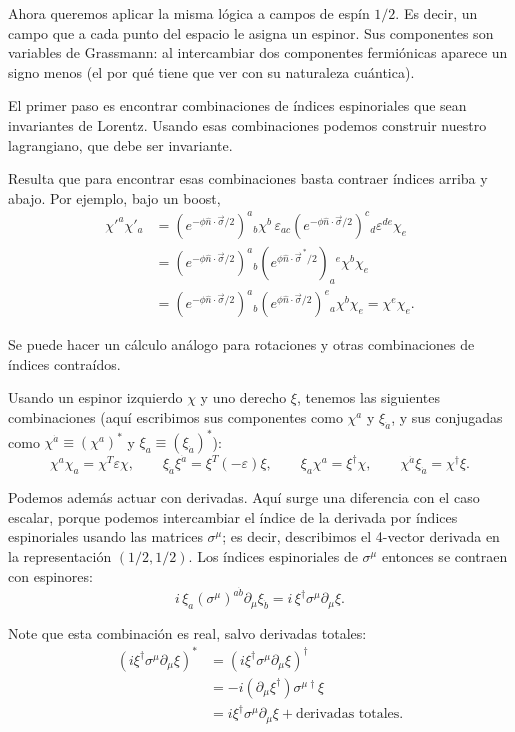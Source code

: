 \documentclass[11pt,a4paper]{article}
\begin{document}
Ahora queremos aplicar la misma lógica a campos de espín $1/2$. Es decir, un campo que a cada punto del espacio le asigna un espinor. Sus componentes son variables de Grassmann: al intercambiar dos componentes fermiónicas aparece un signo menos (el por qué tiene que ver con su naturaleza cuántica).

El primer paso es encontrar combinaciones de índices espinoriales que sean invariantes de Lorentz. Usando esas combinaciones podemos construir nuestro lagrangiano, que debe ser invariante.

Resulta que para encontrar esas combinaciones basta contraer índices arriba y abajo. Por ejemplo, bajo un boost,
\begin{align*}
  \chi'^a\chi'_a
  &=\left(e^{-\phi\hat n\cdot\vec\sigma/2}\right)^a{}_b
    \chi^b\,
    \varepsilon_{ac}
    \left(e^{-\phi\hat n\cdot\vec\sigma/2}\right)^c{}_d
    \varepsilon^{de}\chi_e \\
  &=\left(e^{-\phi\hat n\cdot\vec\sigma/2}\right)^a{}_b
    \left(e^{\phi\hat n\cdot\vec\sigma^{\,*}/2}\right)_a{}^e
    \chi^b\chi_e \\
  &=\left(e^{-\phi\hat n\cdot\vec\sigma/2}\right)^a{}_b
    \left(e^{\phi\hat n\cdot\vec\sigma/2}\right)^e{}_a
    \chi^b\chi_e
   =\chi^e\chi_e.
\end{align*}

Se puede hacer un cálculo análogo para rotaciones y otras combinaciones de índices contraídos.

Usando un espinor izquierdo $\chi$ y uno derecho $\xi$, tenemos las siguientes combinaciones
(aquí escribimos sus componentes como $\chi^a$ y $\xi_{\dot a}$,
y sus conjugadas como $\chi^{\dot a}\equiv(\chi^a)^*$ y
$\xi_a\equiv(\xi_{\dot a})^*$):
\[
  \chi^a\chi_a=\chi^T\varepsilon\chi,
  \qquad
  \xi_{\dot a}\xi^{\dot a}=\xi^T(-\varepsilon)\xi,
  \qquad
  \xi_a\chi^a=\xi^\dagger\chi,
  \qquad
  \chi^{\dot a}\xi_{\dot a}=\chi^\dagger\xi.
\]

Podemos además actuar con derivadas. Aquí surge una diferencia con el caso escalar, porque podemos intercambiar el índice de la derivada por índices espinoriales usando las matrices $\sigma^\mu$; es decir, describimos el 4-vector derivada en la representación $(1/2,1/2)$. Los índices espinoriales de $\sigma^\mu$ entonces se contraen con espinores:
\[
  i\,\xi_a(\sigma^\mu)^{a\dot b}\partial_\mu\xi_{\dot b}
  =i\,\xi^\dagger\sigma^\mu\partial_\mu\xi.
\]

Note que esta combinación es real, salvo derivadas totales:
\begin{align*}
  \left(i\xi^\dagger\sigma^\mu\partial_\mu\xi\right)^*
  &=\left(i\xi^\dagger\sigma^\mu\partial_\mu\xi\right)^\dagger \\
  &=-i(\partial_\mu\xi^\dagger)\sigma^{\mu\dagger}\xi \\
  &=i\xi^\dagger\sigma^\mu\partial_\mu\xi
    +\text{derivadas totales}.
\end{align*}
\end{document}
